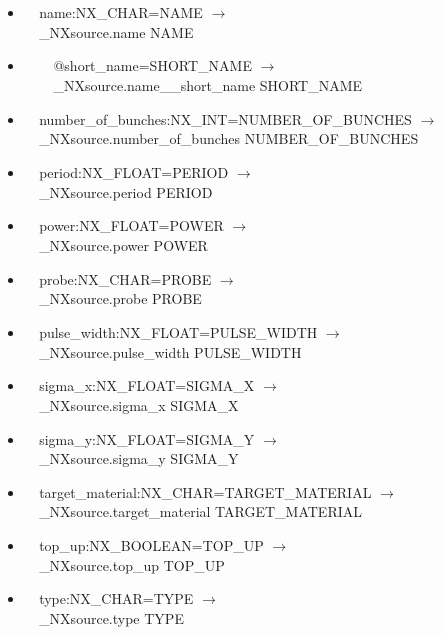 \documentclass[11pt]{article}
\begin{document}
{{\begin{itemize}
\item{\verb|  |name:NX\_CHAR=NAME $\rightarrow$\\
\verb|  |\_NXsource.name NAME}

\item{\verb|    |@short\_name=SHORT\_NAME $\rightarrow$\\
\verb|    |\_NXsource.name\_\_short\_name SHORT\_NAME}

\item{\verb|  |number\_of\_bunches:NX\_INT=NUMBER\_OF\_BUNCHES $\rightarrow$\\
\verb|  |\_NXsource.number\_of\_bunches NUMBER\_OF\_BUNCHES}

\item{\verb|  |period:NX\_FLOAT=PERIOD $\rightarrow$\\
\verb|  |\_NXsource.period PERIOD}

\item{\verb|  |power:NX\_FLOAT=POWER $\rightarrow$\\
\verb|  |\_NXsource.power POWER}

\item{\verb|  |probe:NX\_CHAR=PROBE $\rightarrow$\\
\verb|  |\_NXsource.probe PROBE}

\item{\verb|  |pulse\_width:NX\_FLOAT=PULSE\_WIDTH $\rightarrow$\\
\verb|  |\_NXsource.pulse\_width PULSE\_WIDTH}

\item{\verb|  |sigma\_x:NX\_FLOAT=SIGMA\_X $\rightarrow$\\
\verb|  |\_NXsource.sigma\_x SIGMA\_X}

\item{\verb|  |sigma\_y:NX\_FLOAT=SIGMA\_Y $\rightarrow$\\
\verb|  |\_NXsource.sigma\_y SIGMA\_Y}

\item{\verb|  |target\_material:NX\_CHAR=TARGET\_MATERIAL $\rightarrow$\\
\verb|  |\_NXsource.target\_material TARGET\_MATERIAL}

\item{\verb|  |top\_up:NX\_BOOLEAN=TOP\_UP $\rightarrow$\\
\verb|  |\_NXsource.top\_up TOP\_UP}

\item{\verb|  |type:NX\_CHAR=TYPE $\rightarrow$\\
\verb|  |\_NXsource.type TYPE}


\end{itemize}}}
\end{document}

